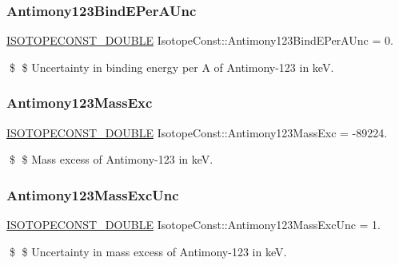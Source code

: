 \subsubsection{\texorpdfstring{Antimony123\+Bind\+E\+Per\+A\+Unc}{Antimony123BindEPerAUnc}}
{\footnotesize\ttfamily \mbox{\hyperlink{group___isotope_const-_macros_ga8f45a7272ce02c0b4c65c44636ed719a}{I\+S\+O\+T\+O\+P\+E\+C\+O\+N\+S\+T\+\_\+\+D\+O\+U\+B\+LE}} Isotope\+Const\+::\+Antimony123\+Bind\+E\+Per\+A\+Unc = 0.}

\$ \$ Uncertainty in binding energy per A of Antimony-\/123 in keV. \mbox{\label{group___isotope_const-_antimony-_sb123_ga984556368604ab0c39ed43709fe9cb3b}} 
\subsubsection{\texorpdfstring{Antimony123\+Mass\+Exc}{Antimony123MassExc}}
{\footnotesize\ttfamily \mbox{\hyperlink{group___isotope_const-_macros_ga8f45a7272ce02c0b4c65c44636ed719a}{I\+S\+O\+T\+O\+P\+E\+C\+O\+N\+S\+T\+\_\+\+D\+O\+U\+B\+LE}} Isotope\+Const\+::\+Antimony123\+Mass\+Exc = -\/89224.}

\$ \$ Mass excess of Antimony-\/123 in keV. \mbox{\label{group___isotope_const-_antimony-_sb123_gafe64e53ce1b2299badf7cff8e15a7d21}} 
\subsubsection{\texorpdfstring{Antimony123\+Mass\+Exc\+Unc}{Antimony123MassExcUnc}}
{\footnotesize\ttfamily \mbox{\hyperlink{group___isotope_const-_macros_ga8f45a7272ce02c0b4c65c44636ed719a}{I\+S\+O\+T\+O\+P\+E\+C\+O\+N\+S\+T\+\_\+\+D\+O\+U\+B\+LE}} Isotope\+Const\+::\+Antimony123\+Mass\+Exc\+Unc = 1.}

\$ \$ Uncertainty in mass excess of Antimony-\/123 in keV. \mbox{\label{group___isotope_const-_antimony-_sb123_gab30bfcec04258db8244bfe3f6dc22196}} 
